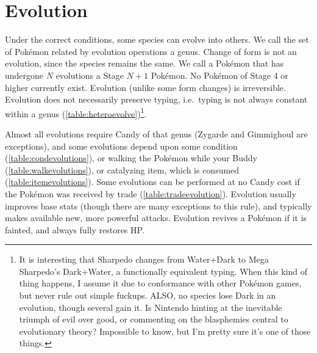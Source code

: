 \section{Evolution}
\label{sec:evolution}
Under the correct conditions, some species can evolve into others.
We call the set of Pokémon related by evolution operations a genus.
Change of form is not an evolution, since the species remains the same.
We call a Pokémon that has undergone $N$ evolutions a Stage $N+1$ Pokémon.
No Pokémon of Stage 4 or higher currently exist.
Evolution (unlike some form changes) is irreversible.
Evolution does not necessarily preserve typing, i.e.\ typing is not always
  constant within a genus (\autoref{table:heteroevolve})\footnote{It is interesting
  that Sharpedo changes from Water+Dark to Mega Sharpedo's Dark+Water,
  a functionally equivalent typing. When this kind of thing happens,
  I assume it due to conformance with other Pokémon games, but never
  rule out simple fuckups. ALSO, no species lose Dark in an evolution,
  though several gain it. Is Nintendo hinting at the inevitable triumph of
  evil over good, or commenting on the blasphemies central to evolutionary theory?
  Impossible to know, but I'm pretty sure it's one of those things.}.

Almost all evolutions require Candy of that genus (Zygarde and Gimmighoul are exceptions),
  and some evolutions depend upon some condition (\autoref{table:condevolutions}),
  or walking the Pokémon while your Buddy (\autoref{table:walkevolutions}),
  or catalyzing item, which is consumed (\autoref{table:itemevolutions}).
Some evolutions can be performed at no Candy cost if the Pokémon was received by trade
 (\autoref{table:tradeevolution}).
Evolution usually improves base stats (though there are many exceptions to this rule),
  and typically makes available new, more powerful attacks.
Evolution revives a Pokémon if it is fainted, and always fully restores HP\@.
